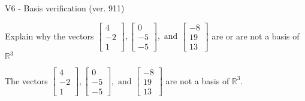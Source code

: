 \begin{exercise}
  \begin{exerciseTitle}V6 - Basis verification (ver. 911)\end{exerciseTitle}
  \begin{exerciseStatement}
    Explain why the vectors \(\left[\begin{array}{r}
4 \\
-2 \\
1
\end{array}\right] , \left[\begin{array}{r}
0 \\
-5 \\
-5
\end{array}\right] , \text{ and } \left[\begin{array}{r}
-8 \\
19 \\
13
\end{array}\right]\) are or are not a basis of \(\mathbb{R}^3\)	


  \end{exerciseStatement}
  \begin{exerciseAnswer}
   The vectors \(\left[\begin{array}{r}
4 \\
-2 \\
1
\end{array}\right] , \left[\begin{array}{r}
0 \\
-5 \\
-5
\end{array}\right] , \text{ and } \left[\begin{array}{r}
-8 \\
19 \\
13
\end{array}\right]\) 
  	 are not  a basis of \(\mathbb{R}^3\).
  


  \end{exerciseAnswer}
\end{exercise}